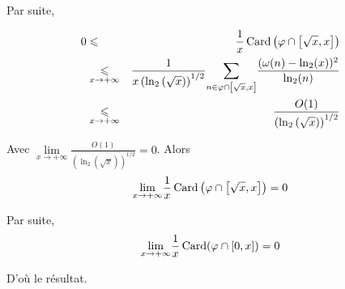 Par suite,


\begin{eqnarray*}
  0 & \leqslant & \frac{1}{x} \operatorname{Card} \left( \varphi \cap \left[ \sqrt{x},
  x \right] \right)\\
  & \underset{x \rightarrow + \infty}{\leqslant} & \frac{1}{x \left( \ln_2
  \left( \sqrt{x} \right) \right)^{1 / 2}} \underset{n \in \varphi \cap \left[
  \sqrt{x}, x \right]}{\sum} \frac{(\omega (n) - \ln_2 (x))^2}{\ln_2 (n)}\\
  & \underset{x \rightarrow + \infty}{\leqslant} & \frac{O (1)}{\left( \ln_2
  \left( \sqrt{x} \right) \right)^{1 / 2}}
\end{eqnarray*}


Avec $\underset{}{} \underset{x \rightarrow + \infty}{\lim} \frac{O
(1)}{\left( \ln_2 \left( \sqrt{x} \right) \right)^{1 / 2}} = 0$. Alors
\[ \underset{x \rightarrow + \infty}{\lim} \frac{1}{x} \operatorname{Card} \left(
   \varphi \cap \left[ \sqrt{x}, x \right] \right) = 0 \]


Par suite,
\[ \underset{x \rightarrow + \infty}{\lim} \frac{1}{x} \operatorname{Card} (\varphi
   \cap [0, x]) = 0 \]


D'o{\`u} le r{\'e}sultat.
